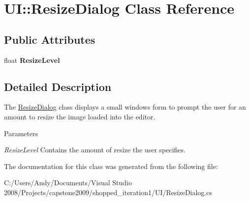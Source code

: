 \hypertarget{class_u_i_1_1_resize_dialog}{
\section{UI::ResizeDialog Class Reference}
\label{class_u_i_1_1_resize_dialog}
}
\subsection*{Public Attributes}
\begin{DoxyCompactItemize}
\item 
\hypertarget{class_u_i_1_1_resize_dialog_af8b6b6d17d8ca70b6721793ca833f7e9}{
float {\bfseries ResizeLevel}}
\label{class_u_i_1_1_resize_dialog_af8b6b6d17d8ca70b6721793ca833f7e9}

\end{DoxyCompactItemize}


\subsection{Detailed Description}
The \hyperlink{class_u_i_1_1_resize_dialog}{ResizeDialog} class displays a small windows form to prompt the user for an amount to resize the image loaded into the editor.


\begin{DoxyParams}{Parameters}
\item[{\em ResizeLevel}]Contains the amount of resize the user specifies. \end{DoxyParams}


The documentation for this class was generated from the following file:\begin{DoxyCompactItemize}
\item 
C:/Users/Andy/Documents/Visual Studio 2008/Projects/capstone2009/shopped\_\-iteration1/UI/ResizeDialog.cs\end{DoxyCompactItemize}
